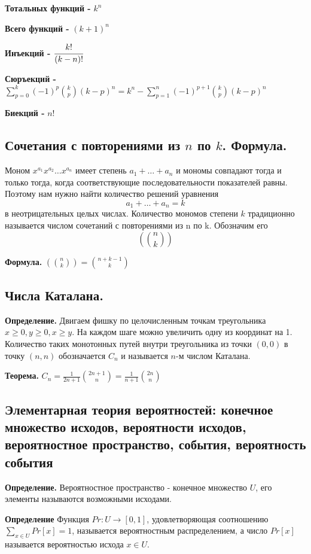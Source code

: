 \documentclass[a4paper, 10pt]{article}
\begin{document}
\textbf{Тотальных функций - } $k^n$

\textbf{Всего функций - } $(k + 1)^n$

\textbf{Инъекций - } $\cfrac{k!}{(k - n)!}$

\textbf{Сюръекций - } $\sum^{k}_{p=0}(-1)^p \binom{k}{p} (k - p)^n = k^n - \sum^{n}_{p=1}(-1)^{p+1} \binom{k}{p}(k - p)^n$

\textbf{Биекций - } $n!$

\subsection{Сочетания с повторениями из $n$ по $k$. Формула.}

Моном $x^{a_1}x^{a_2} \dots x^{a_n}$ имеет степень $a_1 + \dots + a_n$ и
мономы совпадают тогда и только тогда, когда соответствующие последовательности показателей равны. Поэтому нам нужно найти количество решений уравнения
$$a_1 + \dots + a_n = k$$
в неотрицательных целых числах. Количество мономов степени $k$ традиционно называется числом сочетаний с повторениями из n по k. Обозначим его $$\left(\binom{n}{k} \right)$$

\textbf{Формула.} $\left(\binom{n}{k} \right) = \binom{n + k - 1}{k}$

\subsection{Числа Каталана.}

\textbf{Определение.} Двигаем фишку по целочисленным точкам треугольника $x \geqslant 0, y \geqslant 0, x \geqslant y$. На каждом шаге можно увеличить одну из координат на 1. Количество таких монотонных путей внутри треугольника из точки $(0, 0)$ в точку $(n, n)$ обозначается $C_n$ и называется $n$-м числом Каталана.

\textbf{Теорема.} $C_n = \frac{1}{2n+1} \binom{2n+1}{n} = \frac{1}{n+1} \binom{2n}{n}$

\subsection{Элементарная теория вероятностей: конечное множество исходов, вероятности исходов, вероятностное пространство, события, вероятность события}

\textbf{Определение.} Вероятностное пространство - конечное множество $U$, его элементы называются возможными исходами.

\textbf{Определение} Функция $Pr : U \to [0, 1]$, удовлетворяющая соотношению $\sum_{x \in U}Pr[x] = 1$, называется вероятностным распределением, а число $Pr[x]$ называется вероятностью исхода $x \in U$.
\end{document}
